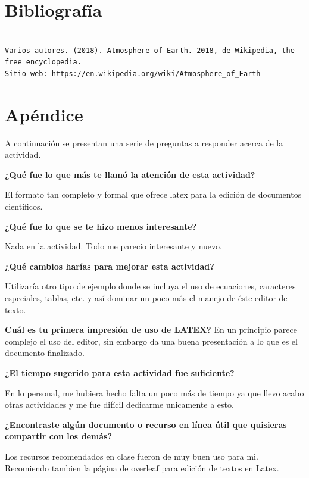 \documentclass[12pt]{article}
\begin{document}

\section{Bibliografía}
\begin{verbatim}

Varios autores. (2018). Atmosphere of Earth. 2018, de Wikipedia, the free encyclopedia.
Sitio web: https://en.wikipedia.org/wiki/Atmosphere_of_Earth

\end{verbatim}
\section{Apéndice}

A continuación se presentan una serie de preguntas a responder acerca de la actividad.

\textbf{¿Qué fue lo que más te llamó la atención de esta actividad?}


El formato tan completo y formal que ofrece latex para la edición de documentos científicos.

\textbf{¿Qué fue lo que se te hizo menos interesante?}

Nada en la actividad. Todo me parecio interesante y nuevo.

\textbf{¿Qué cambios harías para mejorar esta actividad?}

Utilizaría otro tipo de ejemplo donde se incluya el uso de ecuaciones, caracteres especiales, tablas, etc. y así dominar un poco más el manejo de éste editor de texto.

\textbf{Cuál es tu primera impresión de uso de LATEX?}
En un principio parece complejo el uso del editor, sin embargo da una buena presentación a lo que es el documento finalizado.

\textbf{¿El tiempo sugerido para esta actividad fue suficiente?}

En lo personal, me hubiera hecho falta un poco más de tiempo ya que llevo acabo otras actividades y me fue difícil dedicarme unicamente a esto.

\textbf{¿Encontraste algún documento o recurso en línea útil que quisieras compartir con los demás?}

Los recursos recomendados en clase fueron de muy buen uso para mi. Recomiendo tambien la página de overleaf para edición de textos en Latex.
 
\end{document}
